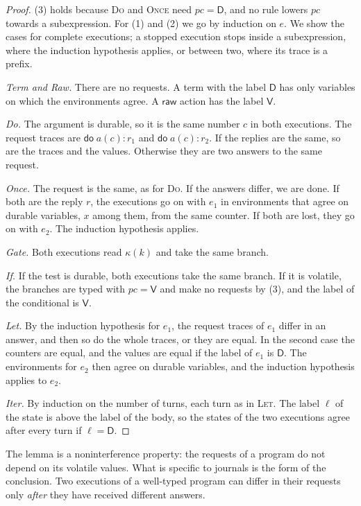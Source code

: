 \documentclass[acmsmall,nonacm,screen]{acmart}
\newcommand{\kw}[1]{\mathsf{#1}}
\newcommand{\D}{\mathsf{D}}
\newcommand{\Vl}{\mathsf{V}}
\begin{document}
\begin{proof}
(3) holds because \textsc{Do} and \textsc{Once} need $pc = \D$, and no rule lowers $pc$
towards a subexpression. For (1) and (2) we go by induction on $e$. We show the cases for
complete executions; a stopped execution stops inside a subexpression, where the induction
hypothesis applies, or between two, where its trace is a prefix.

\emph{Term and Raw.} There are no requests. A term with the label $\D$ has only variables on
which the environments agree. A $\kw{raw}$ action has the label $\Vl$.

\emph{Do.} The argument is durable, so it is the same number $c$ in both executions. The
request traces are $\kw{do}\;a(c){:}r_1$ and $\kw{do}\;a(c){:}r_2$. If the replies are the
same, so are the traces and the values. Otherwise they are two answers to the same request.

\emph{Once.} The request is the same, as for \textsc{Do}. If the answers differ, we are done.
If both are the reply $r$, the executions go on with $e_1$ in environments that agree on
durable variables, $x$ among them, from the same counter. If both are lost, they go on with
$e_2$. The induction hypothesis applies.

\emph{Gate.} Both executions read $\kappa(k)$ and take the same branch.

\emph{If.} If the test is durable, both executions take the same branch. If it is volatile,
the branches are typed with $pc = \Vl$ and make no requests by (3), and the label of the
conditional is $\Vl$.

\emph{Let.} By the induction hypothesis for $e_1$, the request traces of $e_1$ differ in an
answer, and then so do the whole traces, or they are equal. In the second case the counters
are equal, and the values are equal if the label of $e_1$ is $\D$. The environments for $e_2$
then agree on durable variables, and the induction hypothesis applies to $e_2$.

\emph{Iter.} By induction on the number of turns, each turn as in \textsc{Let}. The label
$\ell$ of the state is above the label of the body, so the states of the two executions agree
after every turn if $\ell = \D$.
\end{proof}

The lemma is a noninterference property: the requests of a program do not depend on its
volatile values. What is specific to journals is the form of the conclusion. Two executions
of a well-typed program can differ in their requests only \emph{after} they have received
different answers.
\end{document}
